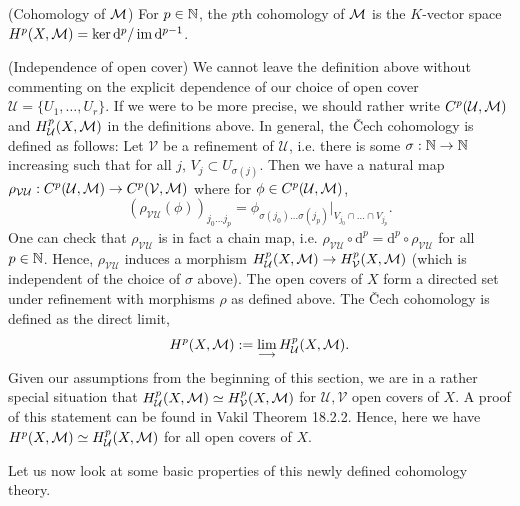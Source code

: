 \documentclass[a4paper,11pt]{article}
\begin{document}
			\begin{defi}
				(Cohomology of $\mathcal{M}$) For $p\in\mathbb{N}$, the $p$th cohomology of $\mathcal{M}$ is the $K$-vector space $H^p(X,\mathcal{M})=\ker\mathrm{d}^p/\operatorname{im}\mathrm{d}^{p-1}$.
			\end{defi}

			\begin{remark}(Independence of open cover)
				We cannot leave the definition above without commenting on the explicit dependence of our choice of open cover $\mathcal{U}=\{U_1,\dots,U_r\}$. If we were to be more precise, we should rather write $C^p(\mathcal{U},\mathcal{M})$ and $H^p_\mathcal{U}(X,\mathcal{M})$ in the definitions above. In general, the {\v C}ech cohomology is defined as follows: Let $\mathcal{V}$ be a refinement of $\mathcal{U}$, i.e. there is some $\sigma:\mathbb{N}\rightarrow\mathbb{N}$ increasing such that for all $j$, $V_j\subset U_{\sigma(j)}$. Then we have a natural map $\rho_{\mathcal{V}\mathcal{U}}:C^p(\mathcal{U},\mathcal{M})\rightarrow C^p(\mathcal{V},\mathcal{M})$ where for $\phi\in C^p(\mathcal{U},\mathcal{M})$,
				\begin{equation*}
					(\rho_{\mathcal{V}\mathcal{U}}(\phi))_{j_0\dots j_p}=\phi_{\sigma(j_0)\dots\sigma(j_p)}|_{V_{j_0}\cap\dots\cap V_{j_p}}.
				\end{equation*}  
				One can check that $\rho_{\mathcal{V}\mathcal{U}}$ is in fact a chain map, i.e. $\rho_{\mathcal{V}\mathcal{U}}\circ \mathrm{d}^p=\mathrm{d}^p\circ\rho_{\mathcal{V}\mathcal{U}}$ for all $p\in\mathbb{N}$. Hence, $\rho_{\mathcal{V}\mathcal{U}}$ induces a morphism $H^p_\mathcal{U}(X,\mathcal{M})\rightarrow H^p_\mathcal{V}(X,\mathcal{M})$ (which is independent of the choice of $\sigma$ above). The open covers of $X$ form a directed set under refinement with morphisms $\rho$ as defined above. The {\v C}ech cohomology is defined as the direct limit,
				\begin{equation*}
					H^p(X,\mathcal{M}):=\underset{\longrightarrow}{\lim}\,H^p_{\mathcal{U}}(X,\mathcal{M}).
				\end{equation*}
				Given our assumptions from the beginning of this section, we are in a rather special situation that $H^p_\mathcal{U}(X,\mathcal{M})\simeq H^p_\mathcal{V}(X,\mathcal{M})$ for $\mathcal{U},\mathcal{V}$ open covers of $X$. A proof of this statement can be found in Vakil Theorem 18.2.2. Hence, here we have $H^p(X,\mathcal{M})\simeq H^p_\mathcal{U}(X,\mathcal{M})$ for all open covers of $X$.
			\end{remark}

			Let us now look at some basic properties of this newly defined cohomology theory.
\end{document}
